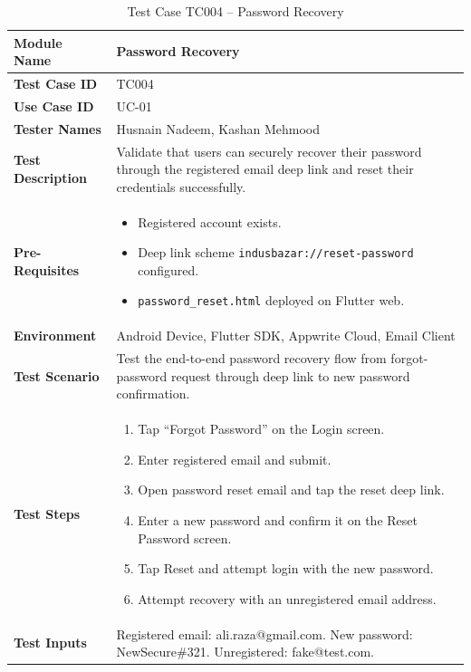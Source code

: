 \begin{table}[H]
\centering
\caption{Test Case TC004 -- Password Recovery}
\label{tab:tc004}
\renewcommand{\arraystretch}{1.15}
\small
\begin{tabular}{|p{3.2cm}|p{10.8cm}|}
\hline
\textbf{Module Name} & Password Recovery \\ \hline
\textbf{Test Case ID} & TC004 \\ \hline
\textbf{Use Case ID} & UC-01 \\ \hline
\textbf{Tester Names} & Husnain Nadeem, Kashan Mehmood \\ \hline
\textbf{Test Description} & Validate that users can securely recover their password through the registered email deep link and reset their credentials successfully. \\ \hline
\textbf{Pre-Requisites} &
\begin{itemize}[leftmargin=*,noitemsep]
\item Registered account exists.
\item Deep link scheme \texttt{indusbazar://reset-password} configured.
\item \texttt{password\_reset.html} deployed on Flutter web.
\end{itemize} \\ \hline
\textbf{Environment} & Android Device, Flutter SDK, Appwrite Cloud, Email Client \\ \hline
\textbf{Test Scenario} & Test the end-to-end password recovery flow from forgot-password request through deep link to new password confirmation. \\ \hline
\textbf{Test Steps} &
\begin{enumerate}[leftmargin=*,noitemsep]
\item Tap ``Forgot Password'' on the Login screen.
\item Enter registered email and submit.
\item Open password reset email and tap the reset deep link.
\item Enter a new password and confirm it on the Reset Password screen.
\item Tap Reset and attempt login with the new password.
\item Attempt recovery with an unregistered email address.
\end{enumerate} \\ \hline
\textbf{Test Inputs} & Registered email: ali.raza@gmail.com. New password: NewSecure\#321. Unregistered: fake@test.com. \\ \hline

\end{tabular}
\end{table}
